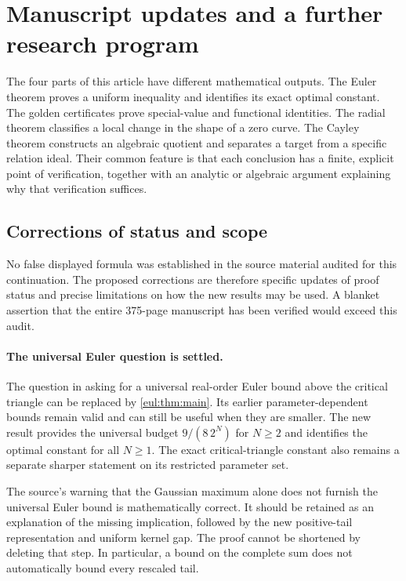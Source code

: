 \section{Manuscript updates and a further research program}
\label{sec:agenda}

The four parts of this article have different mathematical outputs.
The Euler theorem proves a uniform inequality and identifies its exact
optimal constant. The golden certificates prove special-value and
functional identities. The radial theorem classifies a local change
in the shape of a zero curve. The Cayley theorem constructs an
algebraic quotient and separates a target from a specific relation
ideal. Their common feature is that each conclusion has a finite,
explicit point of verification, together with an analytic or algebraic
argument explaining why that verification suffices.

\subsection{Corrections of status and scope}

No false displayed formula was established in the source material
audited for this continuation. The proposed corrections are therefore
specific updates of proof status and precise limitations on how the
new results may be used. A blanket assertion that the entire
375-page manuscript has been verified would exceed this audit.

\paragraph{The universal Euler question is settled.}
The question in  asking for a universal
real-order Euler bound above the critical triangle can be replaced by
\cref{eul:thm:main}. Its earlier parameter-dependent bounds remain valid
and can still be useful when they are smaller. The new result provides
the universal budget $9/(8\,2^N)$ for $N\ge2$ and identifies the optimal
constant for all $N\ge1$. The exact critical-triangle constant also
remains a separate sharper statement on its restricted parameter set.

The source's warning that the Gaussian maximum alone does not furnish
the universal Euler bound is mathematically correct. It should be
retained as an explanation of the missing implication, followed by the
new positive-tail representation and uniform kernel gap. The proof
cannot be shortened by deleting that step. In particular, a bound on
the complete sum does not automatically bound every rescaled tail.

